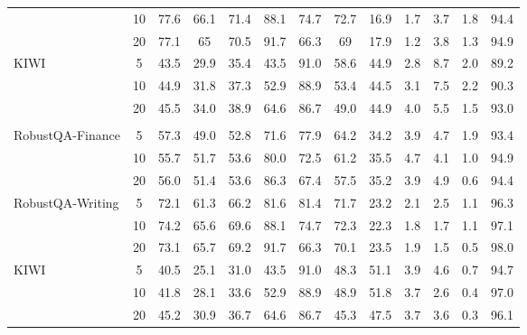 \begin{table}[h]
{\begin{tabular}{lcccccccccccc}
 & 10 & 77.6 & 66.1 & 71.4 & 88.1 & 74.7 & 72.7 & 16.9 & 1.7 & 3.7 & 1.8 & 94.4 \\
 & 20 & 77.1 & 65 & 70.5 & 91.7 & 66.3 & 69 & 17.9 & 1.2 & 3.8 & 1.3 & 94.9 \\
\multirow{3}{*}{KIWI}
 & 5 & 43.5 & 29.9 & 35.4 & 43.5 & 91.0 & 58.6 & 44.9 & 2.8 & 8.7 & 2.0 & 89.2 \\
 & 10 & 44.9 & 31.8 & 37.3 & 52.9 & 88.9 & 53.4 & 44.5 & 3.1 & 7.5 & 2.2 & 90.3 \\
 & 20 & 45.5 & 34.0 & 38.9 & 64.6 & 86.7 & 49.0 & 44.9 & 4.0 & 5.5 & 1.5 & 93.0 \\
\rowcolor{Blue}
\multicolumn{13}{c}{\textbf{E5-Mistral + Llama3 70B}} \\
\multirow{3}{*}{RobustQA-Finance}
 & 5 & 57.3 & 49.0 & 52.8 & 71.6 & 77.9 & 64.2 & 34.2 & 3.9 & 4.7 & 1.9 & 93.4 \\
 & 10 & 55.7 & 51.7 & 53.6 & 80.0 & 72.5 & 61.2 & 35.5 & 4.7 & 4.1 & 1.0 & 94.9 \\
 & 20 & 56.0 & 51.4 & 53.6 & 86.3 & 67.4 & 57.5 & 35.2 & 3.9 & 4.9 & 0.6 & 94.4 \\
\multirow{3}{*}{RobustQA-Writing}
 & 5 & 72.1 & 61.3 & 66.2 & 81.6 & 81.4 & 71.7 & 23.2 & 2.1 & 2.5 & 1.1 & 96.3 \\
 & 10 & 74.2 & 65.6 & 69.6 & 88.1 & 74.7 & 72.3 & 22.3 & 1.8 & 1.7 & 1.1 & 97.1 \\
 & 20 & 73.1 & 65.7 & 69.2 & 91.7 & 66.3 & 70.1 & 23.5 & 1.9 & 1.5 & 0.5 & 98.0 \\
\multirow{3}{*}{KIWI}
 & 5 & 40.5 & 25.1 & 31.0 & 43.5 & 91.0 & 48.3 & 51.1 & 3.9 & 4.6 & 0.7 & 94.7 \\
 & 10 & 41.8 & 28.1 & 33.6 & 52.9 & 88.9 & 48.9 & 51.8 & 3.7 & 2.6 & 0.4 & 97.0 \\
 & 20 & 45.2 & 30.9 & 36.7 & 64.6 & 86.7 & 45.3 & 47.5 & 3.7 & 3.6 & 0.3 & 96.1 \\
\bottomrule
\end{tabular}
}
\end{table}